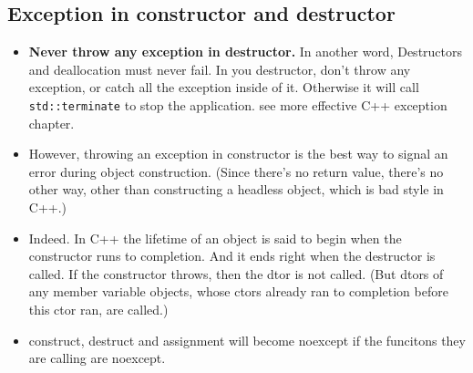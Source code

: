 \documentclass[a4paper,11pt,twoside]{book}
\begin{document}
\subsection{Exception in constructor and destructor}
\begin{itemize}
	\item \textbf{Never throw any exception in destructor.} In another word, Destructors and deallocation must never fail. In you destructor, don't throw any exception, or catch all the exception inside of it. Otherwise it will call \texttt{std::terminate} to stop the application. see more effective C++ exception chapter.
	
	\item However, throwing an exception in constructor is the best way to signal an error during object construction. (Since there's no return value, there's no other way, other than constructing a headless object, which is bad style in C++.)
	
	\item Indeed. In C++ the lifetime of an object is said to begin when the constructor runs to completion. And it ends right when the destructor is called. If the constructor throws, then the dtor is not called. (But dtors of any member variable objects, whose ctors already ran to completion before this ctor ran, are called.)
	
	\item construct, destruct and assignment will become noexcept if the funcitons they are calling are noexcept. 
	
\end{itemize}
\end{document}
